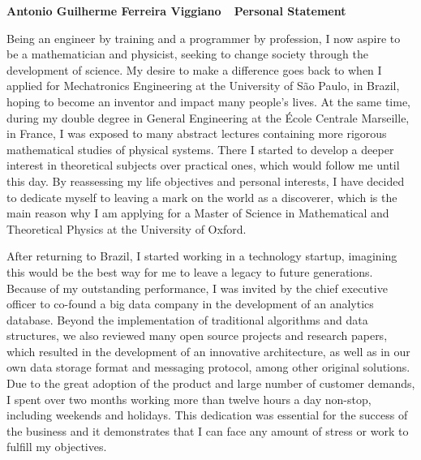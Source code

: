 \documentclass[10pt]{article}
\def\firstname{Antonio Guilherme }
\def\familyname{Ferreira Viggiano}
\def\subj{Personal Statement}
\def\FileTitle{\firstname\familyname~\textemdash~\subj}
\begin{document}
\sffamily %

{\bfseries \FileTitle}


Being an engineer by training and a programmer by profession, I now aspire to be a mathematician and physicist, seeking to change society through the development of science. My desire to make a difference goes back to when I applied for Mechatronics Engineering at the University of São Paulo, in Brazil, hoping to become an inventor and impact many people's lives. At the same time, during my double degree in General Engineering at the École Centrale Marseille, in France, I was exposed to many abstract lectures containing more rigorous mathematical studies of physical systems. There I started to develop a deeper interest in theoretical subjects over practical ones, which would follow me until this day. By reassessing my life objectives and personal interests, I have decided to dedicate myself to leaving a mark on the world as a discoverer, which is the main reason why I am applying for a Master of Science in Mathematical and Theoretical Physics at the University of Oxford.

After returning to Brazil, I started working in a technology startup, imagining this would be the best way for me to leave a legacy to future generations. Because of my outstanding performance, I was invited by the chief executive officer to co-found a big data company in the development of an analytics database. Beyond the implementation of traditional algorithms and data structures, we also reviewed many open source projects and research papers, which resulted in the development of an innovative architecture, as well as in our own data storage format and messaging protocol, among other original solutions. Due to the great adoption of the product and large number of customer demands, I spent over two months working more than twelve hours a day non-stop, including weekends and holidays. This dedication was essential for the success of the business and it demonstrates that I can face any amount of stress or work to fulfill my objectives.
\end{document}

